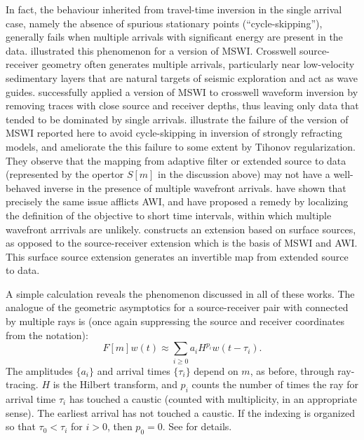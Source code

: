 In fact, the behaviour inherited from travel-time inversion in the
single arrival case, namely the absence of spurious stationary points
(``cycle-skipping''), generally fails when multiple arrivals with
significant energy are present in the data. \cite{Symes:94c}
illustrated this phenomenon for a version of MSWI. Crosswell
source-receiver geometry often generates multiple arrivals,
particularly near low-velocity sedimentary layers that are natural
targets of seismic exploration and act as wave
guides. \cite{Plessix:00} successfully applied a version of MSWI to
crosswell waveform inversion by removing traces with close source and
receiver depths, thus leaving only data that tended to be dominated by
single arrivals. \cite{HuangSymes:Geo17} illustrate the failure of the
version of MSWI reported here to avoid cycle-skipping in inversion of
strongly refracting models, and ameliorate the this failure to some
extent by Tihonov regularization. They observe that the mapping from
adaptive filter or extended source to data (represented by the opertor
$S[m]$ in the discussion above) may not have a well-behaved inverse in
the presence of multiple wavefront arrivals. \cite{Yongetal:GJI23}
have shown that precisely the same issue afflicts AWI, and have
proposed a remedy by localizing the definition of the objective to
short time intervals, within which multiple wavefront arrrivals are
unlikely. \cite{Symes:23} constructs an extension based on surface
sources, as opposed to the source-receiver extension which is the
basis of MSWI and AWI. This surface source extension generates an
invertible map from extended source to data.

A simple calculation reveals the phenomenon discussed in all of these
works. The analogue of the geometric asymptotics for a source-receiver
pair with connected by multiple rays is (once again suppressing the
source and receiver coordinates from the notation):
\begin{equation}
  \label{eqn:multi}
  F[m]w(t) \approx \sum_{i \ge 0} a_i H^{p_i}w(t-\tau_i).
\end{equation}
The amplitudes $\{a_i\}$ and arrival times $\{\tau_i\}$ depend on $m$, as
before, through ray-tracing. $H$ is the Hilbert transform, and $p_i$
counts the number of times the ray for arrival time $\tau_i$ has
touched a caustic (counted with multiplicity, in an appropriate
sense). The earliest arrival has not touched a caustic. If the
indexing is organized so that $\tau_0 < \tau_i$ for $i>0$, then
$p_0=0$. See \cite{Friedlander:75} for details.

